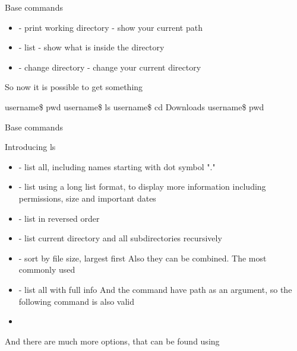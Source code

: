 \documentclass[usenames,dvipsnames,10pt,aspectratio=169]{beamer}
\begin{document}
\begin{frame}{Base commands}
\begin{itemize}
    \item {} - print working directory - show your current path
    \item {} - list - show what is inside the directory
    \item {} - change directory - change your current directory
\end{itemize}
So now it is possible to get something 
\begin{examples}
    username\$ pwd \newline
     \newline
    username\$ ls \newline
     \newline
    username\$ cd Downloads \newline
    username\$ pwd \newline
\end{examples}
\end{frame}
\begin{frame}{Base commands}

{\Large{Introducing ls}} \newline
\begin{itemize}
    \item {} - list all, including names starting with dot symbol "."
    \item {} - list using a long list format, to display more information including permissions, size and important dates
    \item {} - list in reversed order
    \item {} - list current directory and all subdirectories recursively
    \item {} - sort by file size, largest first
    Also they can be combined. The most commonly used
    \item {} - list all with full info
    And the command have path as an argument, so the following command is also valid
    \item {}
\end{itemize}
And there are much more options, that can be found using 
\end{frame}
\end{document}
